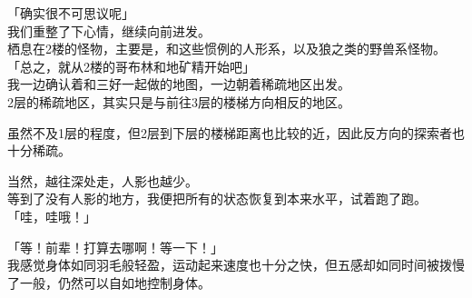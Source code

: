 「确实很不可思议呢」\\

我们重整了下心情，继续向前进发。\\

栖息在2楼的怪物，主要是，和这些惯例的人形系，以及狼之类的野兽系怪物。\\

「总之，就从2楼的哥布林和地矿精开始吧」\\

我一边确认着和三好一起做的地图，一边朝着稀疏地区出发。\\

2层的稀疏地区，其实只是与前往3层的楼梯方向相反的地区。

虽然不及1层的程度，但2层到下层的楼梯距离也比较的近，因此反方向的探索者也十分稀疏。

当然，越往深处走，人影也越少。\\

等到了没有人影的地方，我便把所有的状态恢复到本来水平，试着跑了跑。\\

「哇，哇哦！」

「等！前辈！打算去哪啊！等一下！」\\

我感觉身体如同羽毛般轻盈，运动起来速度也十分之快，但五感却如同时间被拨慢了一般，仍然可以自如地控制身体。\\

